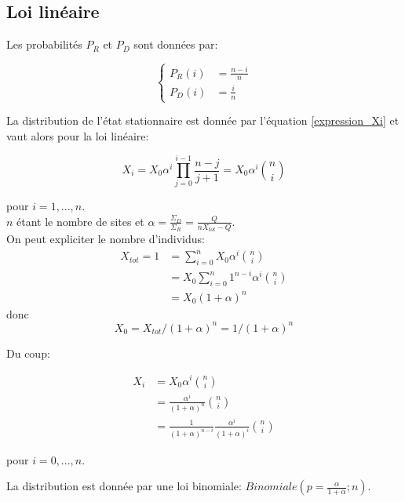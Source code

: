 \subsection{Loi linéaire}
Les probabilités $P_R$ et $P_D$ sont données par:

\begin{equation}
\left \{
\begin{aligned}
P_R(i) &= \frac{n-i}{n}\\
P_D(i) &= \frac{i}{n}
\end{aligned}
\right.
\end{equation}

La distribution de l'état stationnaire est donnée par l'équation \ref{expression_Xi} et vaut alors pour la loi linéaire:

\begin{equation}
X_i=X_0 \alpha^i \prod_{j=0}^{i-1} \frac{n-j}{j+1} =X_0 \alpha^i \binom{n}{i}
\end{equation}

pour $i=1,...,n$. \\

$n$ étant le nombre de sites et $\alpha = \frac{\Sigma_D}{\Sigma_R} = \frac{Q}{nX_{tot}-Q}$.\\

On peut expliciter le nombre d'individus:
\begin{equation}
\begin{aligned}
X_{tot}=1&=\sum_{i=0}^{n}X_0\alpha^i\binom{n}{i}\\
		&= X_0 \sum_{i=0}^n1^{n-i}\alpha^i\binom{n}{i}\\
		&= X_0 (1+\alpha)^n 
\end{aligned}
\end{equation}
donc
\begin{equation}
X_0 = X_{tot}/(1+\alpha)^n=1/(1+\alpha)^n
\end{equation}

Du coup:

\begin{equation}
\begin{aligned}
X_i &= X_0 \alpha^i \binom{n}{i}\\
	&= \frac{\alpha^i}{(1+\alpha)^n} \binom{n}{i}\\
	&= \frac{1}{(1+\alpha)^{n-i}}\frac{\alpha^i}{(1+\alpha)^i}\binom{n}{i}
\end{aligned}
\end{equation}

pour $i=0,...,n$.

La distribution est donnée par une loi binomiale: $Binomiale(p=\frac{\alpha}{1+\alpha};n)$.

